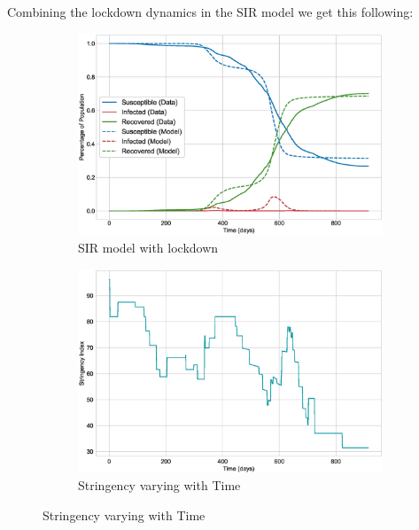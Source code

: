 \documentclass[tikz,fleqn,12pt]{wlscirep}
\begin{document}
Combining the lockdown dynamics in the SIR model we get this following:
\begin{figure}[H]
  \centering
  \caption{SIR Model with lockdown for India}

  \begin{subfigure}[t]{\textwidth}
    \centering
    \includegraphics[scale=0.50]{images/SIR_model_with_lockdown_IND.eps}
    \caption{SIR model with lockdown}
    \label{fig:SIR_model_with_lockdown_IND}
  \end{subfigure}
  
  \begin{subfigure}[t]{\textwidth}
    \centering
    \includegraphics[scale=0.50]{images/stringency_varying_with_time_IND.eps}
    \caption{Stringency varying with Time}
    \label{fig:stringency_varying_with_time_IND}
  \end{subfigure}
\end{figure}
\end{document}
